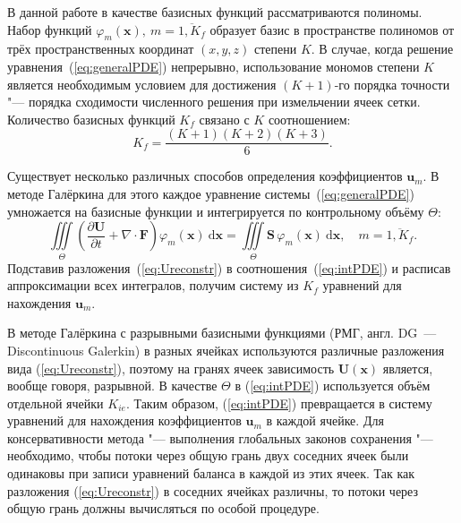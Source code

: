 В данной работе в качестве базисных функций рассматриваются полиномы. Набор функций \(\varphi_m (\mathbf x),~m=\overline{1, K_f}\) образует базис в пространстве полиномов от трёх пространственных координат \((x, y, z)\) степени \(K\). В случае, когда решение уравнения~(\ref{eq:generalPDE}) непрерывно, использование мономов степени \(K\) является необходимым условием для достижения \((K+1)\)-го порядка точности "--- порядка сходимости численного решения при измельчении ячеек сетки. Количество базисных функций \(K_f\) связано с \(K\) соотношением:
\[
K_f = \frac{(K+1) (K+2) (K+3)}{6}.
\]

Существует несколько различных способов определения коэффициентов \(\mathbf u_m\). В методе Галёркина для этого каждое уравнение системы~(\ref{eq:generalPDE}) умножается на базисные функции и интегрируется по контрольному объёму \(\Theta\):
\begin{equation}\label{eq:intPDE}
\iiint\limits_{\Theta} \left(\frac{\partial\mathbf U}{\partial t} + \nabla\cdot \mathbf F\right) \varphi_m(\mathbf x)\: \mathrm d\mathbf x = \iiint\limits_{\Theta} \mathbf S\,\varphi_m(\mathbf x)\: \mathrm d\mathbf x,\quad m = \overline{1, K_f}.
\end{equation}
Подставив разложения~(\ref{eq:Ureconstr}) в соотношения~(\ref{eq:intPDE}) и расписав аппроксимации всех интегралов, получим систему из \(K_f\) уравнений для нахождения \(\mathbf u_m\).

В методе Галёркина с разрывными базисными функциями (РМГ, англ. \textenglish{DG~--- Discontinuous Galerkin}) в разных ячейках используются различные разложения вида (\ref{eq:Ureconstr}), поэтому на гранях ячеек зависимость \(\mathbf U(\mathbf x)\) является, вообще говоря, разрывной. В качестве \(\Theta\) в (\ref{eq:intPDE}) используется объём отдельной ячейки \(K_{ie}\). Таким образом, (\ref{eq:intPDE}) превращается в систему уравнений для нахождения коэффициентов \(\mathbf u_m\) в каждой ячейке. Для консервативности метода "--- выполнения глобальных законов сохранения "--- необходимо, чтобы потоки через общую грань двух соседних ячеек были одинаковы при записи уравнений баланса в каждой из этих ячеек. Так как разложения (\ref{eq:Ureconstr}) в соседних ячейках различны, то потоки через общую грань должны вычисляться по особой процедуре.

